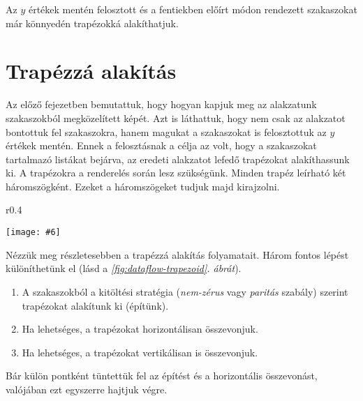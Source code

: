 \documentclass[12pt]{report}
\makeatletter
\theoremstyle{definition}
\newcommand{\melyikoldalra}{r}
\newlength{\Xoffset}
\newlength{\Yoffset}
\newcommand*{\setpdfoffset}[2]{%
  \setlength{\Xoffset}{#1}%
  \setlength{\Yoffset}{#2}%
}
\newcommand*{\setviewport}[4]{%
  \def\x@viewport{%
    {\the\dimexpr#1-\Xoffset}
    {\the\dimexpr#2-\Yoffset}
    {\the\dimexpr#3-\Xoffset}
    {\the\dimexpr#4-\Yoffset}%
  }%
}
\newcommand{\includegraphicskivagas}[6]{
    \setpdfoffset{0pt}{0pt}
    \setviewport{#1}{#2}{#3}{#4}
    \texttt{[image: \#6]}
}
\newcommand{\includedataflowkivagas}[5]{
    \includegraphicskivagas{#1}{#2}{#3}{#4}{scale=0.6,#5}
    {img/built/dataflow_eps}
}
\makeatother
\begin{document}
Az $y$ értékek mentén felosztott és a fentiekben előírt módon rendezett
szakaszokat már könnyedén trapézokká alakíthatjuk.

  \section{Trapézzá alakítás}

Az előző fejezetben bemutattuk, hogy hogyan kapjuk meg az alakzatunk
szakaszokból megközelített képét. Azt is láthattuk, hogy nem csak az alakzatot
bontottuk fel szakaszokra, hanem magukat a szakaszokat is felosztottuk az $y$
értékek mentén. Ennek a felosztásnak a célja az volt, hogy a szakaszokat
tartalmazó listákat bejárva, az eredeti alakzatot lefedő trapézokat
alakíthassunk ki. A trapézokra a renderelés során lesz szükségünk. Minden
trapéz leírható két háromszögként. Ezeket a háromszögeket tudjuk majd
kirajzolni.

  \begin{wrapfigure}{\melyikoldalra}{0.4\textwidth}
    \begin{center}
      \includedataflowkivagas{345pt}{200pt}{525pt}{393pt}{}
    \end{center}
    \caption{\label{fig:dataflow-trapezoid} A trapézzá alakítás és
    összevonás lépései \\ (Részlet az \emph{\ref{appendix:dataflow}. folyamatábrából}.)}
  \end{wrapfigure}

Nézzük meg részletesebben a trapézzá alakítás folyamatait. Három fontos lépést
különíthetünk el (lásd a \emph{\ref{fig:dataflow-trapezoid}. ábrát}).
  \begin{enumerate}
    \item A szakaszokból a kitöltési stratégia (\emph{nem-zérus} vagy
    \emph{paritás} szabály) szerint trapézokat alakítunk ki (építünk).
    \item Ha lehetséges, a trapézokat horizontálisan összevonjuk.
    \item Ha lehetséges, a trapézokat vertikálisan is összevonjuk.
  \end{enumerate}
Bár külön pontként tüntettük fel az építést és a horizontális összevonást,
valójában ezt egyszerre hajtjuk végre.
\end{document}
